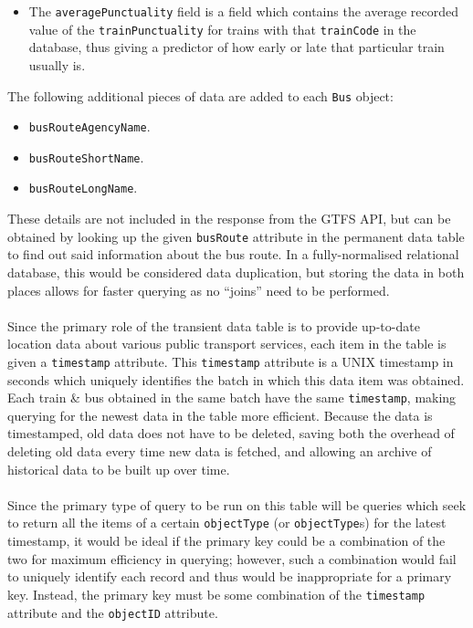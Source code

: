 \documentclass[a4paper,11pt]{report}
\begin{document}
\begin{itemize}
    \item   The \verb|averagePunctuality| field is a field which contains the average recorded value of the \verb|trainPunctuality| for trains with that \verb|trainCode| in the database, thus giving a predictor of how early or late that particular train usually is.
\end{itemize}

The following additional pieces of data are added to each \verb|Bus| object:
\begin{itemize}
    \item   \verb|busRouteAgencyName|.
    \item   \verb|busRouteShortName|.
    \item   \verb|busRouteLongName|.
\end{itemize}

These details are not included in the response from the GTFS API, but can be obtained by looking up the given \verb|busRoute| attribute in the permanent data table to find out said information about the bus route.
In a fully-normalised relational database, this would be considered data duplication, but storing the data in both places allows for faster querying as no ``joins'' need to be performed.
\\\\
Since the primary role of the transient data table is to provide up-to-date location data about various public transport services, each item in the table is given a \verb|timestamp| attribute.
This \verb|timestamp| attribute is a UNIX timestamp in seconds which uniquely identifies the batch in which this data item was obtained.
Each train \& bus obtained in the same batch have the same \verb|timestamp|, making querying for the newest data in the table more efficient.
Because the data is timestamped, old data does not have to be deleted, saving both the overhead of deleting old data every time new data is fetched, and allowing an archive of historical data to be built up over time. 
\\\\
Since the primary type of query to be run on this table will be queries which seek to return all the items of a certain \verb|objectType| (or \verb|objectType|s) for the latest timestamp, it would be ideal if the primary key could be a combination of the two for maximum efficiency in querying;
however, such a combination would fail to uniquely identify each record and thus would be inappropriate for a primary key.
Instead, the primary key must be some combination of the \verb|timestamp| attribute and the \verb|objectID| attribute.
\end{document}
